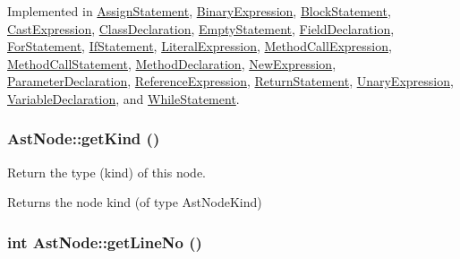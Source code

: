 Implemented in \hyperlink{classAssignStatement_a178a2773781301e16eebfd3d420dc98d}{AssignStatement}, \hyperlink{classBinaryExpression_a2af7e73b6a90c216ef00b6297ce83da5}{BinaryExpression}, \hyperlink{classBlockStatement_a20df05e7536e375226639b483e8c4732}{BlockStatement}, \hyperlink{classCastExpression_af98e34f83dce5fec6d21f4baf4679dea}{CastExpression}, \hyperlink{classClassDeclaration_abb1e806c4c54cfecbc685b5c8a072eae}{ClassDeclaration}, \hyperlink{classEmptyStatement_a54138a042d8de2fecf90448a0048757b}{EmptyStatement}, \hyperlink{classFieldDeclaration_a60ce09d75a5864803ca3b24530267af1}{FieldDeclaration}, \hyperlink{classForStatement_a8d31a952806bc123a2f6227d4aa17f2f}{ForStatement}, \hyperlink{classIfStatement_ab4c2cd2f1c924951d782493281d15249}{IfStatement}, \hyperlink{classLiteralExpression_a02054e805df96a9d75ea64acc35d15a7}{LiteralExpression}, \hyperlink{classMethodCallExpression_a306fe23511d0d35c003a6256816ccea6}{MethodCallExpression}, \hyperlink{classMethodCallStatement_a4bbae8f172868a47ba651f436087e16f}{MethodCallStatement}, \hyperlink{classMethodDeclaration_af4989b6bfa1fdc87be33f4315aa54a7e}{MethodDeclaration}, \hyperlink{classNewExpression_a4b5178e78150432ac58a08197204fa27}{NewExpression}, \hyperlink{classParameterDeclaration_a7e9679286d169930445a159abd5e42ad}{ParameterDeclaration}, \hyperlink{classReferenceExpression_a5235ddeb368f790fd69b73dc1fe5a80e}{ReferenceExpression}, \hyperlink{classReturnStatement_a491cb39772b9054be31d27dbc0d72d0f}{ReturnStatement}, \hyperlink{classUnaryExpression_a555e53bb0a187856275b8d2c885b75d0}{UnaryExpression}, \hyperlink{classVariableDeclaration_af8e0086b00a9bc45f2aff7bf91d8f17d}{VariableDeclaration}, and \hyperlink{classWhileStatement_aeb7e6e61053a3e8a7b82a54c4eb8bf0d}{WhileStatement}.\hypertarget{classAstNode_ac18055137cc3544e330c42f0c41acf86}{
\subsubsection[{getKind}]{ AstNode::getKind ()}}
\label{classAstNode_ac18055137cc3544e330c42f0c41acf86}
Return the type (kind) of this node. \begin{DoxyReturn}{Returns}
the node kind (of type AstNodeKind) 
\end{DoxyReturn}
\hypertarget{classAstNode_a93ce204950529a50b86813904e03dfd7}{
\subsubsection[{getLineNo}]{\setlength{\rightskip}{0pt plus 5cm}int AstNode::getLineNo ()}}
